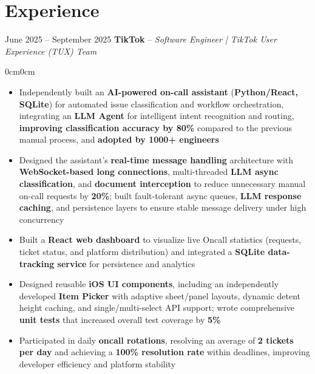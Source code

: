\documentclass[8pt, letterpaper]{article}
\newenvironment{highlights}{
  \begin{itemize}[topsep=0.10cm,parsep=0.10cm,partopsep=0pt,itemsep=0pt,leftmargin=10pt]
}{
  \end{itemize}
}
\newenvironment{onecolentry}{
  \begin{adjustwidth}{0cm}{0cm}
}{
  \end{adjustwidth}
}
\begin{document}
\section{Experience}

\begin{twocolentryLarge}{June 2025 – September 2025}
\textbf{TikTok} – \textit{Software Engineer | TikTok User Experience (TUX) Team}
\end{twocolentryLarge}
\begin{onecolentry}
\begin{highlights}
  \item Independently built an \textbf{AI-powered on-call assistant} (\textbf{Python/React, SQLite}) for automated issue classification and workflow orchestration, integrating an \textbf{LLM Agent} for intelligent intent recognition and routing, \textbf{improving classification accuracy by 80\%} compared to the previous manual process, and \textbf{adopted by 1000+ engineers}
  \item Designed the assistant’s \textbf{real-time message handling} architecture with \textbf{WebSocket-based long connections}, multi-threaded \textbf{LLM async classification}, and \textbf{document interception} to reduce unnecessary manual on-call requests by \textbf{20\%}; built fault-tolerant async queues, \textbf{LLM response caching}, and persistence layers to ensure stable message delivery under high concurrency
  \item Built a \textbf{React web dashboard} to visualize live Oncall statistics (requests, ticket status, and platform distribution) and integrated a \textbf{SQLite data-tracking service} for persistence and analytics
  \item Designed reusable \textbf{iOS UI components}, including an independently developed \textbf{Item Picker} with adaptive sheet/panel layouts, dynamic detent height caching, and single/multi-select API support; wrote comprehensive \textbf{unit tests} that increased overall test coverage by \textbf{5\%}
  \item Participated in daily \textbf{oncall rotations}, resolving an average of \textbf{2 tickets per day} and achieving a \textbf{100\% resolution rate} within deadlines, improving developer efficiency and platform stability
\end{highlights}
\end{onecolentry}
\end{document}

